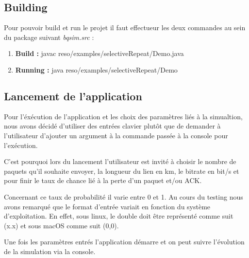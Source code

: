 \documentclass[../rapport.tex]{subfiles}
\begin{document}
\subsection{Building}

	Pour pouvoir build et run le projet il faut effectueur les deux commandes au sein du package 
	suivant \textit{bqsim.src} : 
		
		\begin{enumerate}
			\item\textbf{Build : }  javac reso/examples/selectiveRepeat/Demo.java
			\item\textbf{Running :} java reso/examples/selectiveRepeat/Demo

		\end{enumerate}

\subsection{Lancement de l'application} 

Pour l'éxécution de l'application et les choix des paramètres liés à la simualtion, nous avons
décidé d'utiliser des entrées clavier plutôt que de demander à l'utilisateur d'ajouter
un argument à la commande passée à la console pour l'exécution. 

\medskip

C'est pourquoi lors du lancement l'utilisateur est invité à choisir le nombre de paquets
qu'il souhaite envoyer, la longueur du lien en km, le bitrate en bit/s et pour finir 
le taux de chance lié à la perte d'un paquet et/ou ACK.

\medskip

Concernant ce taux de probabilité il varie entre 0 et 1. Au cours du testing nous avons remarqué
que le format d'entrée variait en fonction du système d'exploitation. En effet, sous linux, le 
double doit être représenté comme suit (x.x) et sous macOS comme suit (0,0).

\medskip 

Une fois les paramètres entrés l'application démarre et on peut suivre l'évolution de la 
simulation via la console.

\newpage
\end{document}
